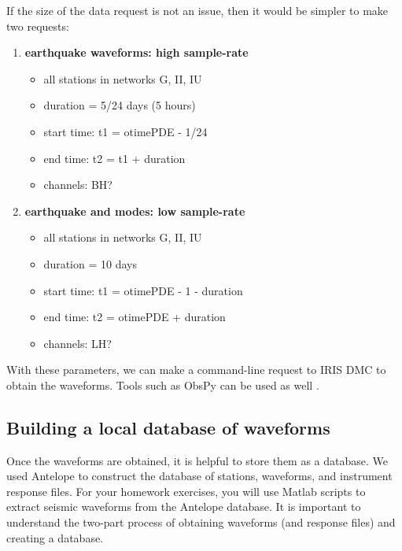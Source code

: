 \documentclass[11pt,titlepage,fleqn]{article}
\begin{document}
If the size of the data request is not an issue, then it would be simpler to make two requests:
%
\begin{enumerate}
\item {\bf earthquake waveforms: high sample-rate}

\begin{itemize}
\item all stations in networks G, II, IU
\item duration = 5/24 days (5 hours)
\item start time: t1 = otimePDE - 1/24
\item end time: t2 = t1 + duration
\item channels: BH?
\end{itemize}

\item {\bf earthquake and modes: low sample-rate}
\begin{itemize}
\item all stations in networks G, II, IU
\item duration = 10 days
\item start time: t1 = otimePDE - 1 - duration
\item end time: t2 = otimePDE + duration
\item channels: LH?
\end{itemize}

\end{enumerate}

With these parameters, we can make a command-line request to IRIS DMC to obtain the waveforms. Tools such as ObsPy can be used as well \citep{obspy2010,obspy2011}.


\subsection{Building a local database of waveforms}

Once the waveforms are obtained, it is helpful to store them as a database. We used Antelope to construct the database of stations, waveforms, and instrument response files. For your homework exercises, you will use Matlab scripts to extract seismic waveforms from the Antelope database. It is important to understand the two-part process of obtaining waveforms (and response files) and creating a database.

\fi




\end{document}
